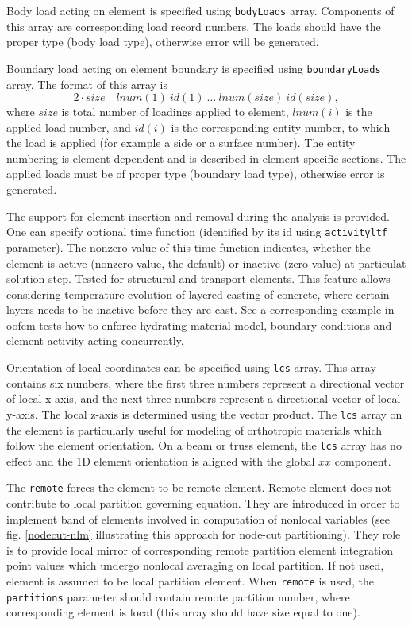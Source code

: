 \documentclass[a4paper]{article}
\newcommand{\param}[1]{\texttt{#1}} %
\newcommand{\Pmode}[1]{{\sffamily #1}}
\begin{document}
Body load acting on element is specified using \param{bodyLoads} array. Components
of this array are corresponding load record numbers. The loads should
have the proper type (body load type), otherwise error will be generated.

Boundary load acting on element boundary is specified using
\param{boundaryLoads} array. The format of this array is
\begin{displaymath}
2\cdot size \quad lnum(1)~id(1)~\dots~lnum(size)~id(size),
\end{displaymath}
where $size$ is total number of loadings applied to element,
$lnum(i)$ is the applied load number, and $id(i)$
is the corresponding entity number, to which the load is applied (for example
a side or a surface number). The entity numbering is element dependent and
is described in element specific sections. The applied loads must be
of proper type (boundary load type), otherwise error is generated.

The support for element insertion and removal during the analysis is provided. One can specify optional time function (identified by its id using \param{activityltf} parameter). The nonzero value of this time function indicates, whether the element is active (nonzero value, the default) or inactive (zero value) at particulat solution step. Tested for structural and transport elements. This feature allows considering temperature evolution of layered casting of concrete, where certain layers needs to be inactive before they are cast. See a corresponding example in oofem
tests how to enforce hydrating material model, boundary conditions and element activity acting concurrently.

Orientation of local coordinates can be specified using \param{lcs} array. This array contains six numbers,
where the first three numbers represent a directional vector of local
x-axis, and the next three numbers represent a directional vector of local
y-axis. The local z-axis is determined using the vector product. The \param{lcs} array on the element is particularly useful for modeling of orthotropic materials which follow the element orientation. On a beam or truss element, the \param{lcs} array has no effect and the 1D element orientation is aligned with the global $xx$ component.

\Pmode{
The \param{remote} forces the element to be remote element. Remote
element does not contribute to local partition governing equation.
They are introduced in order to implement band of elements involved
in computation of nonlocal variables (see fig. \ref{nodecut-nlm} illustrating
this approach for node-cut partitioning). They role is to provide
local mirror of corresponding remote partition element integration point values which undergo
nonlocal averaging on local partition.
If not used, element is assumed to be local partition element.
When \param{remote} is used, the \param{partitions} parameter should
contain remote partition number, where
corresponding element is local (this array should have size equal to one).
}
\end{document}
